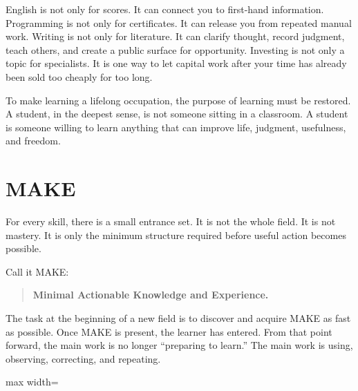 English is not only for scores. It can connect you to first-hand information. Programming is not only for certificates. It can release you from repeated manual work. Writing is not only for literature. It can clarify thought, record judgment, teach others, and create a public surface for opportunity. Investing is not only a topic for specialists. It is one way to let capital work after your time has already been sold too cheaply for too long.

To make learning a lifelong occupation, the purpose of learning must be restored. A student, in the deepest sense, is not someone sitting in a classroom. A student is someone willing to learn anything that can improve life, judgment, usefulness, and freedom.

\section*{MAKE}

For every skill, there is a small entrance set. It is not the whole field. It is not mastery. It is only the minimum structure required before useful action becomes possible.

Call it MAKE:

\begin{quote}
\textbf{Minimal Actionable Knowledge and Experience.}
\end{quote}

The task at the beginning of a new field is to discover and acquire MAKE as fast as possible. Once MAKE is present, the learner has entered. From that point forward, the main work is no longer ``preparing to learn.'' The main work is using, observing, correcting, and repeating.

\begin{center}
\begin{adjustbox}{max width=\linewidth}
\end{adjustbox}
\end{center}

